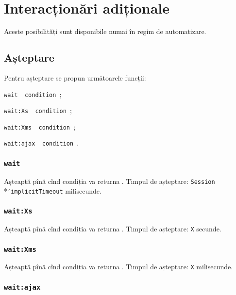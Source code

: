 \section{Interacționări adiționale}

Aceste posibilități sunt disponibile numai în regim de automatizare.

\subsection{Așteptare}

Pentru așteptare se propun următoarele funcții:
\begin{icItems}
	\item \texttt{wait { condition }};
	\item \texttt{wait:Xs { condition }};
	\item \texttt{wait:Xms { condition }};
	\item \texttt{wait:ajax { condition }}.
\end{icItems}

\subsubsection{\texttt{wait}}

Așteaptă pînă cînd condiția va returna \true. Timpul de așteptare: \texttt{Session}\\*\texttt{'implicitTimeout} milisecunde. 

\subsubsection{\texttt{wait:Xs}}

Așteaptă pînă cînd condiția va returna \true. Timpul de așteptare: \texttt{X} secunde. 

\subsubsection{\texttt{wait:Xms}}

Așteaptă pînă cînd condiția va returna \true. Timpul de așteptare: \texttt{X} milisecunde. 

\subsubsection{\texttt{wait:ajax}}

